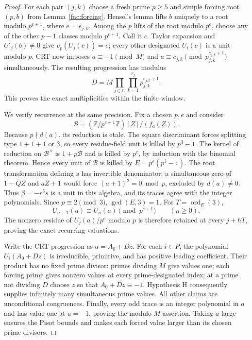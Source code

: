 \documentclass[11pt,a4paper]{article}
\theoremstyle{remark}\newtheorem{remark}[theorem]{Remark}
\begin{document}
\begin{proof}
For each pair $(j,k)$ choose a fresh prime $p\ge5$ and simple forcing root
$(p,b)$ from Lemma~\ref{fac:forcing}. Hensel's lemma lifts $b$ uniquely
to a root modulo $p^{e+1}$, where $e=e_{j,k}$. Among the $p$ lifts of
the root modulo $p^e$, choose any of the other $p-1$ classes modulo
$p^{e+1}$. Call it $c$. Taylor expansion and $U'_j(b)\ne0$ give
$v_p(U_j(c))=e$; every other designated $U_i(c)$ is a unit modulo $p$.
CRT now imposes $a\equiv-1\pmod M$ and
$a\equiv c_{j,k}\pmod{p_{j,k}^{e_{j,k}+1}}$ simultaneously. The resulting
progression has modulus
\[
 D=M\prod_{j\in C}\prod_{k=1}^{r_j}p_{j,k}^{e_{j,k}+1}.
\]
This proves the exact multiplicities within the finite window.

We verify recurrence at the same precision. Fix a chosen $p,e$ and
consider
\[
 \mathcal B=(\mathbb Z/p^{e+1}\mathbb Z)[Z]/(f_a(Z)).
\]
Because $p\nmid d(a)$, its reduction is etale. The square discriminant
forces splitting type $1+1+1$ or $3$, so every residue-field unit is
killed by $p^3-1$. The kernel of reduction on $\mathcal B^\times$ is
$1+p\mathcal B$ and is killed by $p^e$, by induction with the binomial
theorem. Hence every unit of $\mathcal B$ is killed by
$E=p^e(p^3-1)$. The root transformation defining $s$ has invertible
denominator: a simultaneous zero of $1-QZ$ and $aZ+1$ would force
$(a+1)^2=0\bmod p$, excluded by $d(a)\ne0$. Thus $\beta=-r^5s$ is a unit
in this algebra, and its traces agree with the integer polynomials.
Since $p\equiv2\pmod3$, $\gcd(E,3)=1$. For $T=\operatorname{ord}_E(3)$,
\[
 U_{n+T}(a)\equiv U_n(a)\pmod{p^{e+1}}\qquad(n\ge0).
\]
The nonzero residue of $U_j(a)/p^e$ modulo $p$ is therefore retained
at every $j+hT$, proving the exact recurring valuations.

Write the CRT progression as $a=A_0+Dz$. For each $i\in P$, the
polynomial $U_i(A_0+Dz)$ is irreducible, primitive, and has positive
leading coefficient. Their product has no fixed prime divisor:
primes dividing $M$ give values one; each forcing prime gives nonzero
values at every prime-designated index; at a prime not dividing $D$
choose $z$ so that $A_0+Dz\equiv-1$. Hypothesis H consequently supplies
infinitely many simultaneous prime values. All other claims are
unconditional congruences. Finally, every odd trace is an integer
polynomial in $a$ and has value one at $a=-1$, proving the modulo-$M$
assertion. Taking $a$ large ensures the Pisot bounds and makes each
forced value larger than its chosen prime divisors.
\end{proof}
\end{document}
